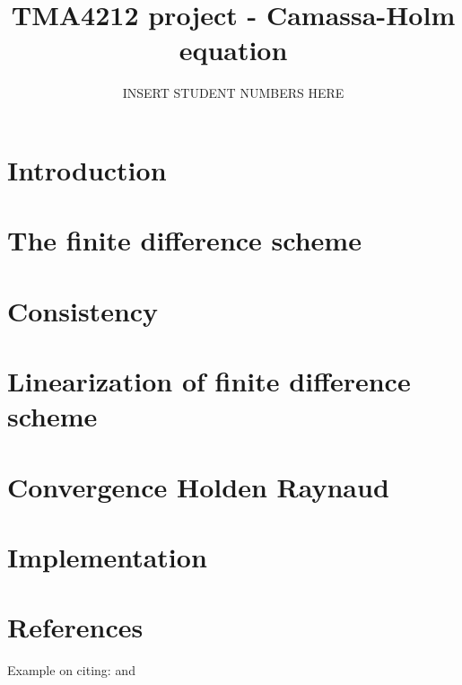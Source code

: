 \documentclass{article}
\title{TMA4212 project - Camassa-Holm equation}
\author{INSERT STUDENT NUMBERS HERE}
\begin{document}
\maketitle

\newpage

\section*{Introduction}


\newpage

\section*{The finite difference scheme}


\newpage

\section*{Consistency}


\newpage


\section*{Linearization of finite difference scheme}


\newpage

\section*{Convergence Holden Raynaud}


\section*{Implementation}


\section*{References}
Example on citing: \cite{holden2006convergence} and \cite{dahlby2007geometric}
{}

\end{document}
